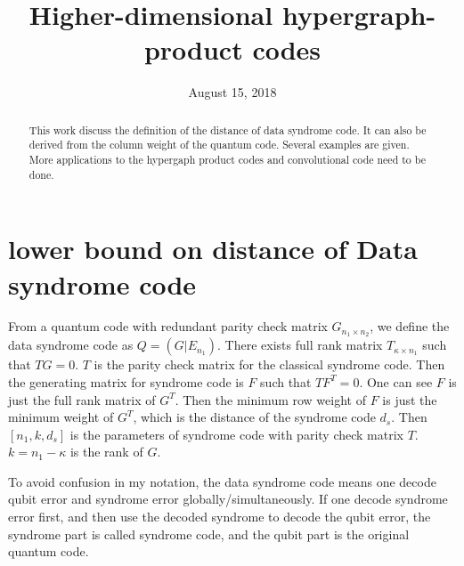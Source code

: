 \documentclass[aps,prb,12pt,tightenlines,%
notitlepage,longbibliography]{revtex4-1}
\begin{document}
\title{Higher-dimensional hypergraph-product codes}
\date{August 15, 2018} 
\begin{abstract}
 This work discuss the definition of the distance of data syndrome code. It can also be derived from the column weight of the quantum code. Several examples are given. More applications to the hypergaph product codes and convolutional code need to be done.
\end{abstract}
\maketitle


\section{lower bound on distance of Data syndrome code}
From a quantum code with redundant parity check matrix $G_{n_1 \times n_2}$, we define the data syndrome code as $Q=( G|E_{n_1} )$. There exists full rank matrix $T_{\kappa \times n_1}$ such that $TG=0$. $T$ is the parity check matrix for the classical syndrome code. Then the generating matrix for syndrome code is $F$ such that $TF^T=0$. One can see $F$ is just the full rank matrix of $G^T$. Then the minimum row weight of $F$ is just the minimum weight of $G^T$, which is the distance of the syndrome code $d_s$. Then $[n_1,k,d_s]$ is the parameters of syndrome code with parity check matrix $T$. $k=n_1-\kappa$ is the rank of $G$.

To avoid confusion in my notation, the data syndrome code means one decode qubit error and syndrome error globally/simultaneously. If one decode syndrome error first, and then use the decoded syndrome to decode the qubit error,  the syndrome part is called syndrome code, and the qubit part is the original quantum code.
\end{document}
